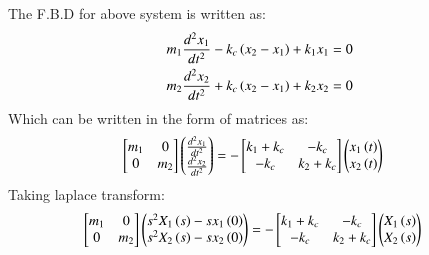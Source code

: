 \documentclass[journal,12pt,twocolumn]{IEEEtran}
\theoremstyle{remark}
\begin{document}
The F.B.D for above system is written as:
\begin{align}
m_1 \frac{d^2 x_1}{dt^2} - k_c\left(x_2-x_1\right) + k_1 x_1 &=0\\
m_2 \frac{d^2 x_2}{dt^2} + k_c\left(x_2-x_1\right) + k_2 x_2 &=0
\end{align}
Which can be written in the form of matrices as:
\begin{align}
\begin{bmatrix}
m_1&0\\
0&m_2\end{bmatrix}
\begin{pmatrix}
\frac{d^2x_1}{dt^2}\\
\frac{d^2x_2}{dt^2}
\end{pmatrix}
&= -\begin{bmatrix}
k_1+k_c&-k_c\\
-k_c&k_2+k_c\end{bmatrix}
\begin{pmatrix}
x_1\left(t\right)\\
x_2\left(t\right)
\end{pmatrix} \label{eq: 2021_ae_32_1}
\end{align}
Taking laplace transform:
\begin{align}
\begin{bmatrix}
m_1&0\\
0&m_2\end{bmatrix}
\begin{pmatrix}
s^2 X_1\left(s\right)-sx_1\left(0\right)\\
s^2 X_2\left(s\right)-sx_2\left(0\right)
\end{pmatrix}
&= -\begin{bmatrix}
k_1+k_c&-k_c\\
-k_c&k_2+k_c\end{bmatrix}
\begin{pmatrix}
X_1\left(s\right)\\
X_2\left(s\right)
\end{pmatrix}
\end{align}
\end{document}
